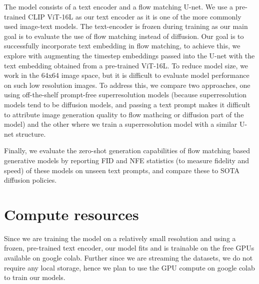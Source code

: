 \documentclass[12pt]{article}
\begin{document}
The model consists of a text encoder and a flow matching U-net. We use a pre-trained CLIP ViT-16L as our text encoder as it is one of the more commonly used image-text models. The text-encoder is frozen during training as our main goal is to evaluate the use of flow matching instead of diffusion. Our goal is to successfully incorporate text embedding in flow matching, to achieve this, we explore with augmenting the timestep embeddings passed into the U-net with the text embedding obtained from a pre-trained ViT-16L. To reduce model size, we work in the 64x64 image space, but it is difficult to evaluate model performance on such low resolution images. To address this, we compare two approaches, one using off-the-shelf prompt-free superresolution models (because superresolution models tend to be diffusion models, and passing a text prompt makes it difficult to attribute  image generation quality to flow mathcing or diffusion part of the model) and the other where we train a superresolution model with a similar U-net structure.

Finally, we evaluate the zero-shot generation capabilities of flow matching based generative models by reporting FID and NFE statistics (to measure fidelity and speed) of these models on unseen text prompts, and compare these to SOTA diffusion policies.

\section{Compute resources}
Since we are training the model on a relatively small resolution and using a frozen, pre-trained text encoder, our model fits and is trainable on the free GPUs available on google colab. Further since we are streaming the datasets, we do not require any local storage, hence we plan to use the GPU compute on google colab to train our models.



\end{document}
